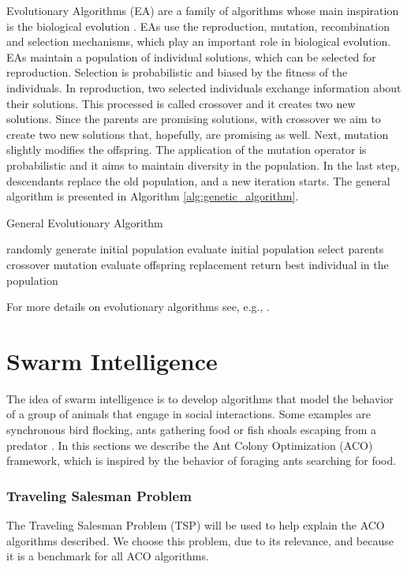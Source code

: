 			Evolutionary Algorithms (EA) are a family of algorithms whose main inspiration is the biological evolution \cite{eiben03}. EAs use the reproduction, mutation, recombination and selection mechanisms, which play an important role in biological evolution.	
			EAs maintain a population of individual solutions, which can be selected for reproduction. Selection is probabilistic and biased by the fitness of the individuals. In reproduction, two selected individuals exchange information about their solutions. This processed is called crossover and it creates two new solutions. Since the parents are promising solutions, with crossover we aim to create two new solutions that, hopefully, are promising as well. 
			Next, mutation slightly modifies the offspring. The application of the mutation operator is probabilistic and it aims to maintain diversity in the population.
			In the last step, descendants replace the old population, and a new iteration starts.
			The general algorithm is presented in Algorithm \ref{alg:genetic_algorithm}.
			\begin{algorithm}
				\caption{General Evolutionary Algorithm}
				\label{alg:genetic_algorithm}
				\begin{algorithmic}
				\STATE randomly generate initial population
				\STATE evaluate initial population
					\STATE select parents
					\STATE crossover
					\STATE mutation
					\STATE evaluate offspring
					\STATE replacement
				\ENDWHILE
				\STATE return best individual in the population
				\end{algorithmic}
			\end{algorithm} 
			
			For more details on evolutionary algorithms see, e.g., \cite{eiben03}.
			
		\section{Swarm Intelligence}
		\label{subsec:swarm_intelligence}
		The idea of swarm intelligence is to develop algorithms that model the behavior of a group of animals that engage in social interactions. Some examples are synchronous bird flocking, ants gathering food or fish shoals escaping from a predator \cite{si01}. In this sections we describe the Ant Colony Optimization (ACO) framework, which is inspired by the behavior of foraging ants searching for food.
		
		\subsubsection*{Traveling Salesman Problem}
		 The Traveling Salesman Problem (TSP) will be used to help explain the ACO algorithms described. We choose this problem, due to its relevance, and because it is a benchmark for all ACO algorithms.
		
